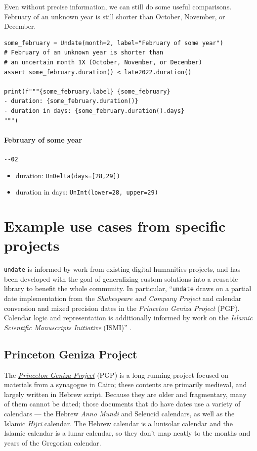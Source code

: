 \documentclass[final]{anthology-ch} %
\begin{document}
Even without precise information, we can still do some useful comparisons. February of an unknown year is still shorter than October, November, or December.

\begin{verbatim}
some_february = Undate(month=2, label="February of some year")
# February of an unknown year is shorter than 
# an uncertain month 1X (October, November, or December) 
assert some_february.duration() < late2022.duration()

print(f"""{some_february.label} {some_february}
- duration: {some_february.duration()}
- duration in days: {some_february.duration().days}
""")

\end{verbatim}

\paragraph{February of some year} \texttt{{-}{-02}}
\begin{itemize}
    \item duration: \texttt{UnDelta(days=[28,29])}
    \item duration in days: \texttt{UnInt(lower=28, upper=29)}
\end{itemize}
    
\section{Example use cases from specific projects}\label{example-use-cases-from-specific-projects}
\texttt{undate} is informed by work from existing digital humanities projects, and has been developed with the goal of generalizing custom solutions into a reusable library to benefit the whole community. In particular, ``\texttt{undate} draws on a partial date implementation from the \textit{Shakespeare and Company Project} and calendar conversion and mixed precision dates in the \textit{Princeton Geniza Project} (PGP). Calendar logic and representation is additionally informed by work on the \textit{Islamic Scientific Manuscripts Initiative} (ISMI)'' \cite{koeser_undate_2025}.

\subsection{Princeton Geniza Project}\label{princeton-geniza-project}

The \href{https://geniza.princeton.edu/}{\textit{Princeton Geniza Project}} (PGP) is a long-running project focused on materials from a synagogue in Cairo; these contents are primarily medieval, and largely written in Hebrew script. Because they are older and fragmentary, many of them cannot be dated;  those documents that do have dates use a variety of calendars — the Hebrew \textit{Anno Mundi} and Seleucid calendars, as well as the Islamic \textit{Hijri} calendar. The Hebrew calendar is a lunisolar calendar and the Islamic calendar is a lunar calendar, so they don’t map neatly to the months and years of the Gregorian calendar.
\end{document}
